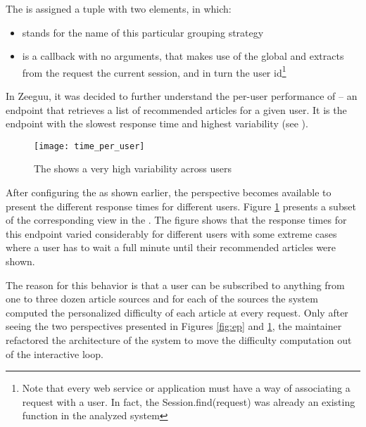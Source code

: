 The  is assigned a tuple with two elements, in which:  

\begin{itemize}
	\item {} stands for the name of this particular grouping strategy
	\item {} is a callback with no arguments, 
	that makes use of the global  and extracts from 
	the request the current session, and in turn the user id\footnote{
		Note that every web service or application must have a way of 
		associating a request with a user. In fact, the Session.find(request) 
		was already an existing function in the analyzed system}
\end{itemize}


In Zeeguu, it was decided to further understand the per-user performance of \epFeedItems
--  an endpoint that retrieves a list of recommended articles for a given user.
It is the endpoint with the slowest response time and highest variability (see ). 


\begin{figure}[h!]
  \centering
  \texttt{[image: time\_per\_user]}
  \caption{The \epFeedItems shows a very high variability across users}
  \label{fig:tpu}
\end{figure}


After configuring the \tool as shown earlier, the  perspective becomes available to  present the different response times for different users. Figure \ref{fig:tpu} presents a subset of the corresponding view in the \tool. The figure shows that the response times for this endpoint varied considerably for different users with some extreme cases where a user has to wait a full minute until their recommended articles were shown. 

The reason for this behavior is that a user can be subscribed to anything from one to three dozen 
article sources and for each of the sources the system computed the personalized difficulty 
of each article at every request. Only after seeing the two perspectives presented in Figures \ref{fig:ep} and \ref{fig:tpu}, the maintainer refactored the architecture of the system to move the difficulty computation out of the interactive loop.






